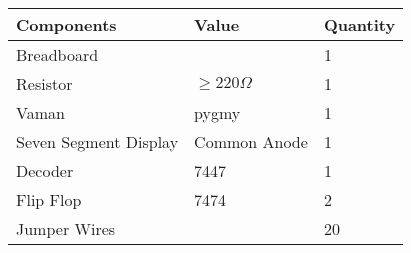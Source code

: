 \begin{tabular}{|p{4cm}|p{3cm}|p{3cm}|}
\hline                                        
\textbf{Components} & \textbf{Value} & \textbf{Quantity}\\                                          
\hline                                 
Breadboard &      & 1 \\           
\hline                                    
Resistor & $ \geq 220\Omega $ & 1 \\     
\hline                      
Vaman & pygmy & 1 \\       
\hline                                     
Seven Segment Display & Common Anode & 1\\
\hline                      
Decoder & 7447 & 1 \\        
\hline                     
Flip Flop & 7474 & 2 \\
\hline                        
Jumper Wires &    & 20\\   
	\hline
\end{tabular}
